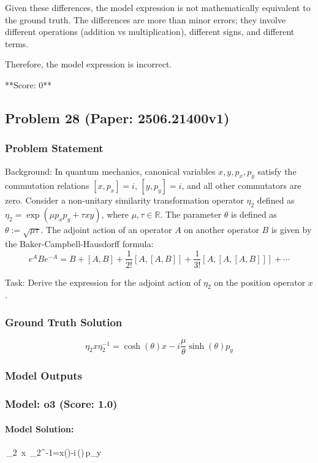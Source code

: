 \documentclass[10pt]{article}
\begin{document}
Given these differences, the model expression is not mathematically equivalent to the ground truth. The differences are more than minor errors; they involve different operations (addition vs multiplication), different signs, and different terms.

Therefore, the model expression is incorrect.

**Score: 0**

\newpage
\subsection*{Problem 28 (Paper: 2506.21400v1)}
\subsubsection*{Problem Statement}
Background:
In quantum mechanics, canonical variables $x, y, p_x, p_y$ satisfy the commutation relations $[x, p_x] = i$, $[y, p_y] = i$, and all other commutators are zero. Consider a non-unitary similarity transformation operator $\eta_2$ defined as $\eta_2 = \exp\left( \mu p_x p_y + \tau x y \right)$, where $\mu, \tau \in \mathbb{R}$. The parameter $\theta$ is defined as $\theta := \sqrt{\mu \tau}$. The adjoint action of an operator $A$ on another operator $B$ is given by the Baker-Campbell-Hausdorff formula:
$$e^A B e^{-A} = B + [A, B] + \frac{1}{2!}[A, [A, B]] + \frac{1}{3!}[A, [A, [A, B]]] + \cdots$$

Task:
Derive the expression for the adjoint action of $\eta_2$ on the position operator $x$.

\subsubsection*{Ground Truth Solution}
\[ \boxed{\eta_2 x \eta_2^{-1} = \cosh ( \theta ) x - i \frac{\mu}{\theta} \sinh( \theta) p_y} \]

\subsubsection*{Model Outputs}
\subsubsection*{Model: o3 (Score: 1.0)}
\paragraph*{Model Solution:}
\,\eta_{2}\, x\, \eta_{2}^{-1}=x\cosh\!\bigl(\sqrt{\mu\tau}\bigr)\;-\;i\,\frac{\mu}{\sqrt{\mu\tau}}\sinh\!\bigl(\sqrt{\mu\tau}\bigr)\,p_{y}\,
\end{document}
